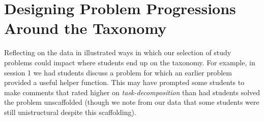 


\section{Designing Problem Progressions Around the Taxonomy}
\label{s:problem-design}

Reflecting on the data in  illustrated
ways in which our selection of study problems could impact
where students end up on the taxonomy.  For example, in session 1 we
had students discuss a problem for which an earlier problem provided a
useful helper function.  This may have prompted some students to make
comments that rated higher on \emph{task-decomposition} than had
students solved the problem unscaffolded (though we note from our data
that some students were still unistructural despite this scaffolding).

